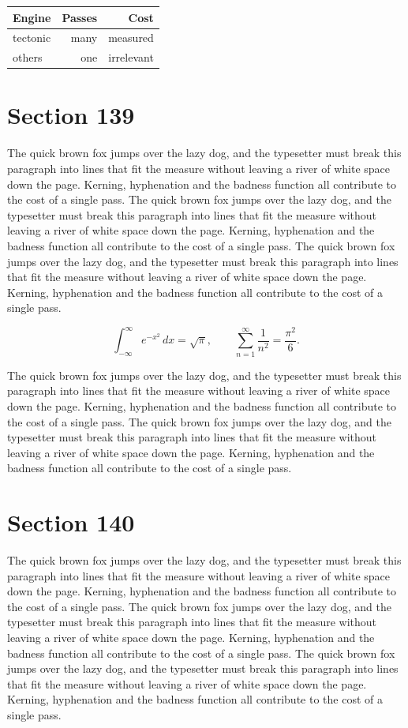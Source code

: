 \documentclass{article}
\begin{document}
\begin{center}
\begin{tabular}{lrr}
\toprule
Engine & Passes & Cost \\
\midrule
tectonic & many & measured \\
others & one & irrelevant \\
\bottomrule
\end{tabular}
\end{center}

\section{Section 139}
The quick brown fox jumps over the lazy dog, and the typesetter must break this paragraph into lines that fit the measure without leaving a river of white space down the page. Kerning, hyphenation and the badness function all contribute to the cost of a single pass. The quick brown fox jumps over the lazy dog, and the typesetter must break this paragraph into lines that fit the measure without leaving a river of white space down the page. Kerning, hyphenation and the badness function all contribute to the cost of a single pass. The quick brown fox jumps over the lazy dog, and the typesetter must break this paragraph into lines that fit the measure without leaving a river of white space down the page. Kerning, hyphenation and the badness function all contribute to the cost of a single pass. 

\begin{equation}
\int_{-\infty}^{\infty} e^{-x^{2}}\,dx = \sqrt{\pi}, \qquad
\sum_{n=1}^{\infty} \frac{1}{n^{2}} = \frac{\pi^{2}}{6}.
\end{equation}

The quick brown fox jumps over the lazy dog, and the typesetter must break this paragraph into lines that fit the measure without leaving a river of white space down the page. Kerning, hyphenation and the badness function all contribute to the cost of a single pass. The quick brown fox jumps over the lazy dog, and the typesetter must break this paragraph into lines that fit the measure without leaving a river of white space down the page. Kerning, hyphenation and the badness function all contribute to the cost of a single pass. 
\section{Section 140}
The quick brown fox jumps over the lazy dog, and the typesetter must break this paragraph into lines that fit the measure without leaving a river of white space down the page. Kerning, hyphenation and the badness function all contribute to the cost of a single pass. The quick brown fox jumps over the lazy dog, and the typesetter must break this paragraph into lines that fit the measure without leaving a river of white space down the page. Kerning, hyphenation and the badness function all contribute to the cost of a single pass. The quick brown fox jumps over the lazy dog, and the typesetter must break this paragraph into lines that fit the measure without leaving a river of white space down the page. Kerning, hyphenation and the badness function all contribute to the cost of a single pass. 
\end{document}
